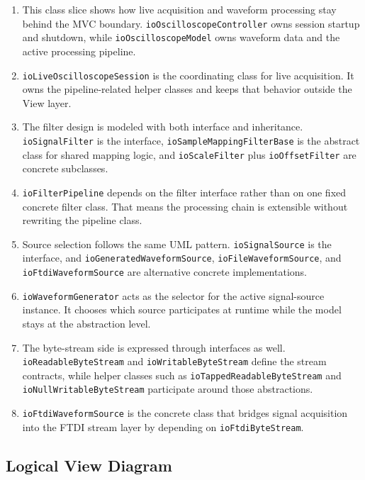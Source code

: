 \begin{enumerate}
    \item This class slice shows how live acquisition and waveform processing stay behind the MVC boundary. \texttt{ioOscilloscopeController} owns session startup and shutdown, while \texttt{ioOscilloscopeModel} owns waveform data and the active processing pipeline.
    \item \texttt{ioLiveOscilloscopeSession} is the coordinating class for live acquisition. It owns the pipeline-related helper classes and keeps that behavior outside the View layer.
    \item The filter design is modeled with both interface and inheritance. \texttt{ioSignalFilter} is the interface, \texttt{ioSampleMappingFilterBase} is the abstract class for shared mapping logic, and \texttt{ioScaleFilter} plus \texttt{ioOffsetFilter} are concrete subclasses.
    \item \texttt{ioFilterPipeline} depends on the filter interface rather than on one fixed concrete filter class. That means the processing chain is extensible without rewriting the pipeline class.
    \item Source selection follows the same UML pattern. \texttt{ioSignalSource} is the interface, and \texttt{ioGeneratedWaveformSource}, \texttt{ioFileWaveformSource}, and \texttt{ioFtdiWaveformSource} are alternative concrete implementations.
    \item \texttt{ioWaveformGenerator} acts as the selector for the active signal-source instance. It chooses which source participates at runtime while the model stays at the abstraction level.
    \item The byte-stream side is expressed through interfaces as well. \texttt{ioReadableByteStream} and \texttt{ioWritableByteStream} define the stream contracts, while helper classes such as \texttt{ioTappedReadableByteStream} and \texttt{ioNullWritableByteStream} participate around those abstractions.
    \item \texttt{ioFtdiWaveformSource} is the concrete class that bridges signal acquisition into the FTDI stream layer by depending on \texttt{ioFtdiByteStream}.
\end{enumerate}

\subsection{Logical View Diagram}
\label{Section::Logical View Diagram}

